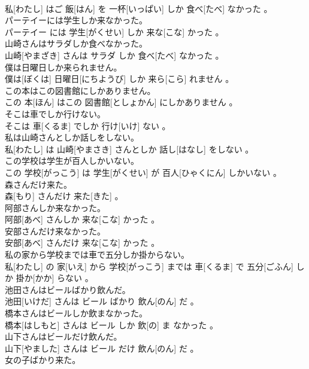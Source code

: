 \documentclass[8pt]{extreport}
\begin{document}
\begin{CJK}{UTF8}{min}
\\	私[わたし] はご 飯[はん] を 一杯[いっぱい] しか 食べ[たべ] なかった 。
\\	パーテイーには学生しか来なかった。	
\\	パーテイー には 学生[がくせい] しか 来な[こな] かった 。
\\	山崎さんはサラダしか食べなかった。	
\\	山崎[やまざき] さんは サラダ しか 食べ[たべ] なかった 。
\\	僕は日曜日しか来られません。	
\\	僕は[ぼくは] 日曜日[にちようび] しか 来ら[こら] れません 。
\\	この本はこの図書館にしかありません。	
\\	この 本[ほん] はこの 図書館[としょかん] にしかありません 。
\\	そこは車でしか行けない。	
\\	そこは 車[くるま] でしか 行け[いけ] ない 。
\\	私は山崎さんとしか話しをしない。	
\\	私[わたし] は 山崎[やまさき] さんとしか 話し[はなし] をしない 。
\\	この学校は学生が百人しかいない。	
\\	この 学校[がっこう] は 学生[がくせい] が 百人[ひゃくにん] しかいない 。
\\	森さんだけ来た。	
\\	森[もり] さんだけ 来た[きた] 。
\\	阿部さんしか来なかった。	
\\	阿部[あべ] さんしか 来な[こな] かった 。
\\	安部さんだけ来なかった。	
\\	安部[あべ] さんだけ 来な[こな] かった 。
\\	私の家から学校までは車で五分しか掛からない。	
\\	私[わたし] の 家[いえ] から 学校[がっこう] までは 車[くるま] で 五分[ごふん] しか 掛か[かか] らない 。
\\	池田さんはビールばかり飲んだ。	
\\	池田[いけだ] さんは ビール ばかり 飲ん[のん] だ 。
\\	橋本さんはビールしか飲まなかった。	
\\	橋本[はしもと] さんは ビール しか 飲[の] ま なかった 。
\\	山下さんはビールだけ飲んだ。	
\\	山下[やました] さんは ビール だけ 飲ん[のん] だ 。
\\	女の子ばかり来た。	

\end{CJK}
\end{document}
